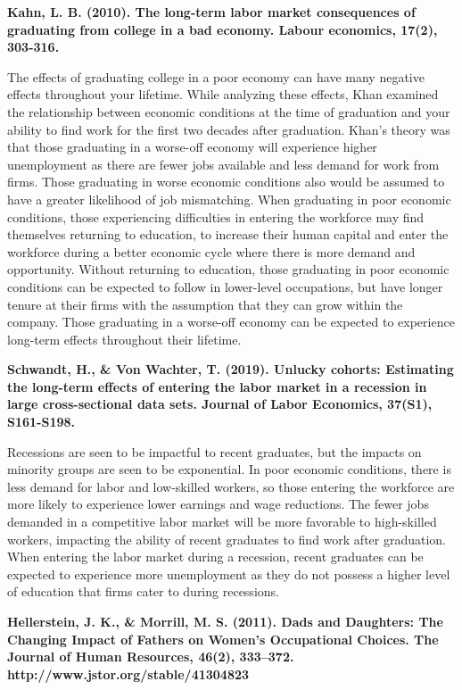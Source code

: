 \documentclass[12pt]{article}
\begin{document}
\textbf{Kahn, L. B. (2010). The long-term labor market consequences of graduating from college in a bad economy. Labour economics, 17(2), 303-316.}

    The effects of graduating college in a poor economy can have many negative effects throughout your lifetime. While analyzing these effects, Khan examined the relationship between economic conditions at the time of graduation and your ability to find work for the first two decades after graduation. Khan’s theory was that those graduating in a worse-off economy will experience higher unemployment as there are fewer jobs available and less demand for work from firms. Those graduating in worse economic conditions also would be assumed to have a greater likelihood of job mismatching. When graduating in poor economic conditions, those experiencing difficulties in entering the workforce may find themselves returning to education, to increase their human capital and enter the workforce during a better economic cycle where there is more demand and opportunity. Without returning to education, those graduating in poor economic conditions can be expected to follow in lower-level occupations, but have longer tenure at their firms with the assumption that they can grow within the company. Those graduating in a worse-off economy can be expected to experience long-term effects throughout their lifetime. 


  \textbf{Schwandt, H., & Von Wachter, T. (2019). Unlucky cohorts: Estimating the long-term effects of entering the labor market in a recession in large cross-sectional data sets. Journal of Labor Economics, 37(S1), S161-S198.}
	
    Recessions are seen to be impactful to recent graduates, but the impacts on minority groups are seen to be exponential. In poor economic conditions, there is less demand for labor and low-skilled workers, so those entering the workforce are more likely to experience lower earnings and wage reductions. The fewer jobs demanded in a competitive labor market will be more favorable to high-skilled workers, impacting the ability of recent graduates to find work after graduation. When entering the labor market during a recession, recent graduates can be expected to experience more unemployment as they do not possess a higher level of education that firms cater to during recessions. 

 \textbf{ Hellerstein, J. K., & Morrill, M. S. (2011). Dads and Daughters: The Changing Impact of Fathers on Women’s Occupational Choices. The Journal of Human Resources, 46(2), 333–372. http://www.jstor.org/stable/41304823}
 
\end{document}
